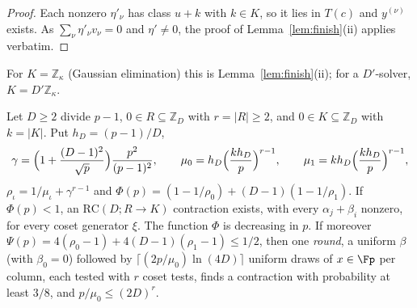 \begin{proof}
Each nonzero $\eta'_\nu$ has class $u + k$ with $k \in K$, so it lies in $T(c)$ and $y^{(\nu)}$ exists. As $\sum_\nu\eta'_\nu v_\nu = 0$ and $\eta' \ne 0$, the proof of Lemma~\ref{lem:finish}(ii) applies verbatim.
\end{proof}

For $K = \mathbb{Z}_\kappa$ (Gaussian elimination) this is Lemma~\ref{lem:finish}(ii); for a $D'$-solver, $K = D'\mathbb{Z}_\kappa$.

\begin{lemma}
\label{lem:sm}
Let $D \ge 2$ divide $p-1$, $0 \in R \subseteq \mathbb{Z}_D$ with $r = |R| \ge 2$, and $0 \in K \subseteq \mathbb{Z}_D$ with $k = |K|$. Put $h_D = (p-1)/D$,
\[
  \gamma = \Bigl(1 + \frac{(D-1)^2}{\sqrt p}\Bigr)\frac{p^2}{(p-1)^2},\qquad
  \mu_0 = h_D\Bigl(\frac{kh_D}{p}\Bigr)^{r-1},\qquad \mu_1 = kh_D\Bigl(\frac{kh_D}{p}\Bigr)^{r-1},
\]
$\rho_\iota = 1/\mu_\iota + \gamma^{r-1}$ and $\Phi(p) = (1 - 1/\rho_0) + (D-1)(1-1/\rho_1)$. If $\Phi(p) < 1$, an $\mathrm{RC}(D;R\to K)$ contraction exists, with every $\alpha_j + \beta_i$ nonzero, for every coset generator $\xi$. The function $\Phi$ is decreasing in $p$. If moreover $\Psi(p) = 4(\rho_0-1) + 4(D-1)(\rho_1-1) \le 1/2$, then one \emph{round}, a uniform $\beta$ (with $\beta_0 = 0$) followed by $\lceil (2p/\mu_0)\ln(4D)\rceil$ uniform draws of $x \in \Fp$ per column, each tested with $r$ coset tests, finds a contraction with probability at least $3/8$, and $p/\mu_0 \le (2D)^r$.
\end{lemma}

